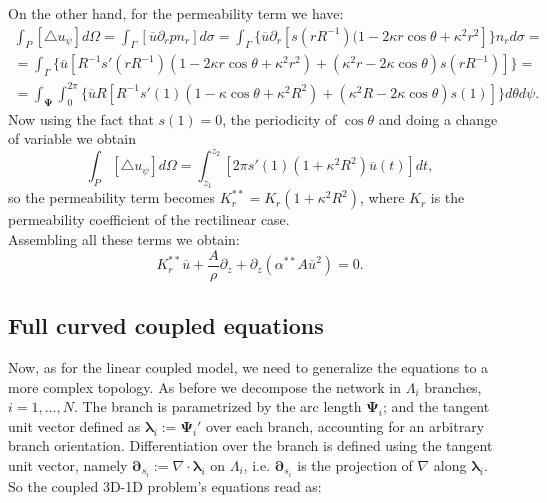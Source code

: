 \documentclass[a4paper]{report}
\begin{document}
On the other hand, for the permeability term we have:
	\begin{equation*}
	\begin{split}
	\int_P [\triangle u_{\psi}] d\Omega= \int_{\Gamma}[\overline{u}\partial_r p n_r] d\sigma= \int_{\Gamma}\{\overline{u}\partial_r[s(rR^{-1}) (1-2\kappa r \cos \theta+\kappa^2 r^2]\}n_r d\sigma=\\
=\int_{\Gamma}\{ \overline{u}[R^{-1} s'(rR^{-1})(1-2 \kappa r \cos \theta + \kappa^2 r^2)+(\kappa^2 r - 2 \kappa \cos \theta)s(r R^{-1})]\}= \\
=\int_{\boldsymbol{\Psi}}\int_0^{2\pi} \{ \overline{u}R[R^{-1}s'(1)(1-\kappa \cos \theta + \kappa^2 R^2) + (\kappa^2 R - 2 \kappa \cos \theta)s(1)] \} d\theta d\psi.
	\end{split}
	\end{equation*}
Now using the fact that $s(1)=0$, the periodicity of $\cos \theta$ and doing a change of variable we obtain
\begin{equation}
	\int_P [\triangle u_{\psi} ]d\Omega= \int_{z_1}^{z_2}[2 \pi s'(1) (1+\kappa^2 R^2) \overline{u}(t)]dt,
\end{equation}
so the permeability term becomes $K_r^{**}=K_r(1+\kappa^2 R^2)$, where $K_r$ is the permeability coefficient of the rectilinear case.\\
Assembling all these terms we obtain:
	\begin{equation}
	K_r^{**} \overline{u}+ \frac{A}{\rho} \partial_z+ \partial_z (\alpha^{**} A \overline{u}^2) =0.
	\end{equation}

\subsection{Full curved coupled equations}
Now, as for the linear coupled model, we need to generalize the equations to a more complex topology. As before we decompose the network in $\Lambda_i$ branches, $i=1,...,N$. The branch is parametrized by the arc length $\boldsymbol{\Psi}_i$; and the tangent unit vector defined as $\boldsymbol{\lambda}_i:= \boldsymbol{\Psi}_i'$ over each branch, accounting for an arbitrary branch orientation. Differentiation over the branch is defined using the tangent unit vector, namely $\boldsymbol{\partial}_{s_i}:= \nabla \cdot \boldsymbol{\lambda}_i$ on $\Lambda_i$, i.e. $\boldsymbol{\partial}_{s_i}$ is the projection of $\nabla$ along $\boldsymbol{\lambda}_i$.\\
So the coupled 3D-1D problem's equations read as:
\end{document}
